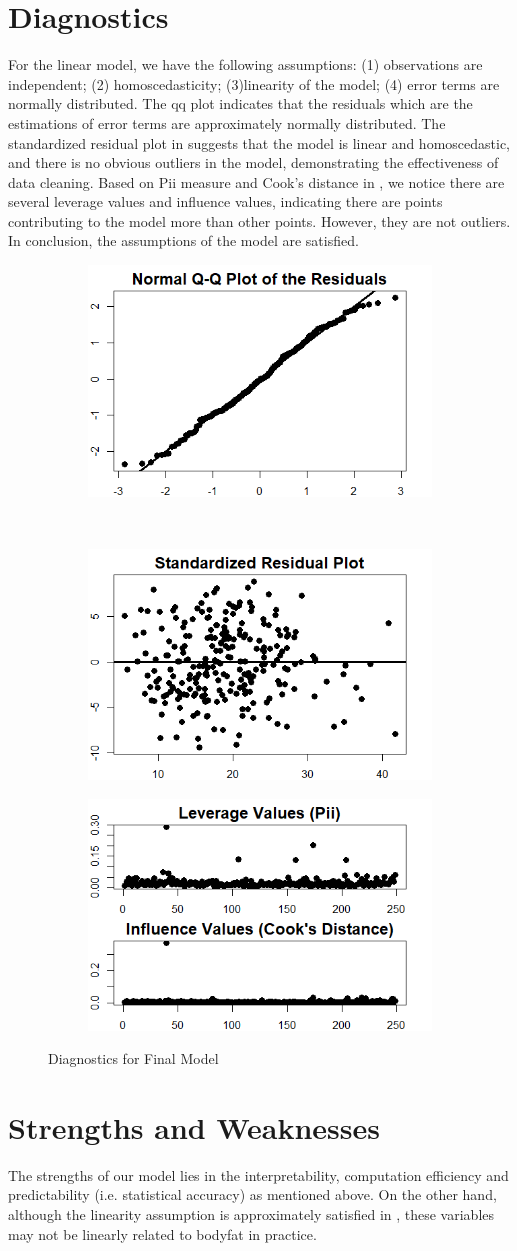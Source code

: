 \documentclass[11pt, letterpaper]{article}
\begin{document}
\section{Diagnostics}
\label{sec:diag}
For the linear model, we have the following assumptions: (1) observations are independent; (2) homoscedasticity; (3)linearity of the model; (4) error terms are normally distributed. The qq plot  indicates that the residuals which are the estimations of error terms are approximately normally distributed. The standardized residual plot in  suggests that the model is linear and homoscedastic, and there is no obvious outliers in the model, demonstrating the effectiveness of data cleaning. Based on Pii measure and Cook's distance in , we notice there are several leverage values and influence values, indicating there are points contributing to the model more than other points. However, they are not outliers. In conclusion, the assumptions of the model are satisfied. 
\begin{figure}
	\centering
	\label{fig:2}
	\begin{subfigure}
		\centering
		\includegraphics[width=.2\linewidth]{../Image/qq_plot.png}
	\end{subfigure}%
~
	\begin{subfigure}
		\centering
		\includegraphics[width=.2\linewidth]{../Image/Final_Model_Residual_Plot.png}
	\end{subfigure}
	\begin{subfigure}
	\centering
	\includegraphics[width=.3\linewidth]{../Image/Pii_Cook's_Distance.png}
\end{subfigure}
	\caption{Diagnostics for Final Model}
\end{figure}
\section{Strengths and Weaknesses}
The strengths of our model lies in the interpretability, computation efficiency and predictability (i.e. statistical accuracy) as mentioned above. On the other hand, although the linearity assumption is approximately satisfied in , these variables may not be linearly related to bodyfat in practice. 
\end{document}
